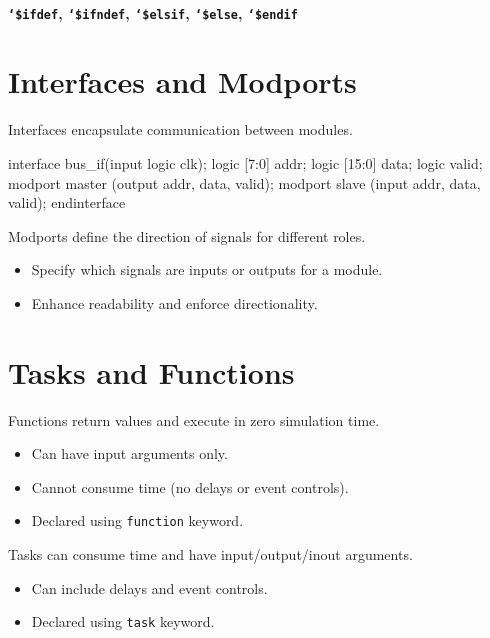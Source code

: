 \paragraph{\texttt{`\$ifdef}, \texttt{`\$ifndef}, \texttt{`\$elsif}, \texttt{`\$else}, \texttt{`\$endif}}

\section{Interfaces and Modports}

Interfaces encapsulate communication between modules.
\begin{verilogcode}
interface bus_if(input logic clk);
    logic [7:0] addr;
    logic [15:0] data;
    logic valid;
    modport master (output addr, data, valid);
    modport slave (input addr, data, valid);
endinterface
\end{verilogcode}

Modports define the direction of signals for different roles.

\begin{itemize}
    \item Specify which signals are inputs or outputs for a module.
    \item Enhance readability and enforce directionality.
\end{itemize}

\section{Tasks and Functions}
Functions return values and execute in zero simulation time.
\begin{itemize}
    \item Can have input arguments only.
    \item Cannot consume time (no delays or event controls).
    \item Declared using \texttt{function} keyword.
\end{itemize}

Tasks can consume time and have input/output/inout arguments.

\begin{itemize}
    \item Can include delays and event controls.
    \item Declared using \texttt{task} keyword.
\end{itemize}

